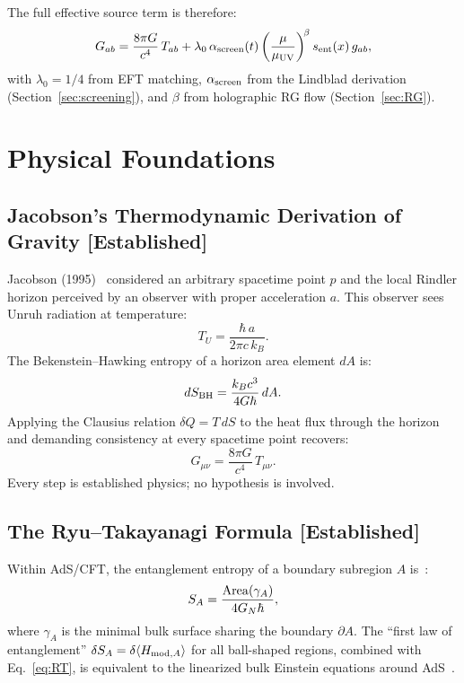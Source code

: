 \documentclass[12pt]{article}
\newcommand{\established}{\textbf{[Established]}}
\begin{document}
The full effective source term is therefore:
\begin{equation}
G_{ab} = \frac{8\pi G}{c^4}\,T_{ab}
+ \lambda_0\,\alpha_{\rm screen}(t)
\left(\frac{\mu}{\mu_{\rm UV}}\right)^{\!\beta}
s_{\rm ent}(x)\,g_{ab},
\label{eq:full_source}
\end{equation}
with $\lambda_0 = 1/4$ from EFT matching, $\alpha_{\rm screen}$ from the Lindblad
derivation (Section~\ref{sec:screening}), and $\beta$ from holographic RG flow
(Section~\ref{sec:RG}).

\section{Physical Foundations}
\label{sec:foundations}

\subsection{Jacobson's Thermodynamic Derivation of Gravity \established}

Jacobson (1995)~\cite{Jacobson1995} considered an arbitrary spacetime point $p$ and the
local Rindler horizon perceived by an observer with proper acceleration $a$. This observer
sees Unruh radiation at temperature:
\begin{equation}
T_U = \frac{\hbar\,a}{2\pi c\,k_B}.
\label{eq:Unruh}
\end{equation}
The Bekenstein--Hawking entropy of a horizon area element $dA$ is:
\begin{equation}
dS_{\rm BH} = \frac{k_B c^3}{4G\hbar}\,dA.
\label{eq:BH}
\end{equation}
Applying the Clausius relation $\delta Q = T\,dS$ to the heat flux through the horizon
and demanding consistency at every spacetime point recovers:
\begin{equation}
G_{\mu\nu} = \frac{8\pi G}{c^4}\,T_{\mu\nu}.
\label{eq:Einstein}
\end{equation}
Every step is established physics; no hypothesis is involved.

\subsection{The Ryu--Takayanagi Formula \established}

Within AdS/CFT, the entanglement entropy of a boundary subregion $A$ is~\cite{RT2006}:
\begin{equation}
S_A = \frac{{\rm Area}(\gamma_A)}{4G_N\hbar},
\label{eq:RT}
\end{equation}
where $\gamma_A$ is the minimal bulk surface sharing the boundary $\partial A$.
The ``first law of entanglement'' $\delta S_A = \delta\langle H_{{\rm mod},A}\rangle$
for all ball-shaped regions, combined with Eq.~\eqref{eq:RT}, is equivalent to the
linearized bulk Einstein equations around AdS~\cite{Faulkner2014,Lashkari2014}.
\end{document}
